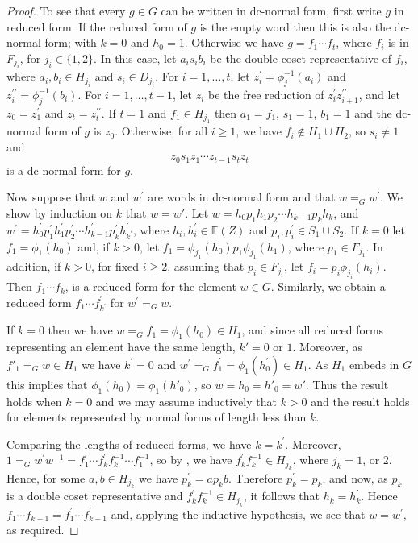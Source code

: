 \documentclass[a4paper,12pt]{article}
\numberwithin{equation}{section}
\numberwithin{figure}{section}
\newcommand{\FF}{\ensuremath{\mathbb{F}}}
\begin{document}
\begin{proof}
To see that every $g\in G$ can be written in dc-normal form, first
write $g$ in reduced form. If the reduced form of $g$ is the empty
word then this is also the dc-normal form; with $k=0$ and $h_0=1$. 
Otherwise we have $g=f_1\cdots f_t$, where $f_i$ is in $F_{j_i}$, for
$j_i\in \{1,2\}$. In this case, let $a_is_ib_i$
be the double coset representative of $f_i$, where 
$a_i,b_i\in H_{j_i}$ and $s_i\in D_{j_i}$. For $i=1,\ldots ,t$,
 let $z^{\prime}_i=\phi_j^{-1}(a_i)$ and
$z^{\prime\prime}_i=\phi_j^{-1}(b_i)$. For $i=1,\ldots ,t-1$, let 
$z_i$ be the free reduction of $z^{\prime}_iz^{\prime\prime}_{i+1}$, 
and let $z_0=z^{\prime}_1$ and $z_t=
z^{\prime\prime}_t$. 
 If $t=1$ and $f_1\in H_{j_1}$ then $a_1=f_1$, $s_1=1$, $b_1=1$ and 
the dc-normal form of $g$ is $z_0$. Otherwise, for all $i\ge 1$, we 
have $f_i\notin H_1\cup H_2$, so $s_i\neq 1$ and 
\[z_0s_1z_1\cdots z_{t-1}s_tz_t\]
is a dc-normal form for $g$.

Now suppose that $w$ and $w^\prime$ are words in dc-normal form and that
$w=_G w^\prime$. We show by induction on $k$ that $w=w'$. 
Let $w=h_{0}p_1h_{1}p_2 \cdots h_{k-1}p_kh_{{k}}$,
and $w^\prime =h_{0}^\prime p_1^\prime h_{1}^\prime  p_2^\prime
\cdots h_{k-1}^\prime p_k^\prime h_{{k^\prime}}^\prime$, where
$h_i, h_i^\prime\in \FF(Z)$ and $p_i,p_i^\prime\in S_1\cup S_2$.
If $k=0$ let $f_1=\phi_1(h_0)$ and, if $k>0$, 
let $f_1=\phi_{j_1}(h_0)p_1\phi_{j_1}(h_1)$, where $p_1\in F_{j_1}$. 
 In addition, if $k>0$,  
 for fixed $i\ge 2$, assuming that $p_i\in F_{j_i}$, 
let $f_i=p_i\phi_{j_i}(h_i)$.
 Then $f_1\cdots f_k$, is
a reduced form for the element $w\in G$. Similarly, we obtain a reduced
form $f_1^\prime \cdots f_{k^\prime}^\prime$ for $w^\prime=_G w$. 

If $k=0$ then we have $w=_G f_1=\phi_1(h_0)\in H_{1}$, and since all 
reduced forms representing an element have the same length, $k'=0$ or $1$. 
Moreover, as $f'_1=_G w\in H_1$ we have 
 $k^\prime =0$ and $w^\prime=_G f_1^\prime=\phi_1(h_0^\prime)\in H_1$.
As $H_1$ embeds in $G$ this implies that $\phi_1(h_0)=\phi_1(h'_0)$, so
$w=h_0=h'_0=w'$. Thus the result
holds when $k=0$ and we may assume inductively that $k>0$ and the result holds
for elements represented by normal forms of length less than $k$.

Comparing the lengths of reduced forms, we have $k=k^\prime$.
Moreover, $1=_G w^\prime w^{-1}= f_1^\prime \cdots f_{k}^\prime
f_k^{-1}\cdots f_1^{-1}$, so by \cite[Chapter IV, Theorem 2.6]{LS}, 
we have $ f_{k}^\prime f_k^{-1}\in H_{j_k}$, where $j_k=1$, or $2$. Hence, for
some $a, b\in H_{j_k}$ we have $p_k^\prime=a p_k b$. Therefore $p_k^\prime =p_k$,
and now, as $p_k$ is a double coset representative and  $ f_{k}^\prime f_k^{-1}\in H_{j_k}$,
it follows that $h_k=h_k^\prime$. Hence $f_1\cdots f_{k-1}=
f_1^\prime \cdots f_{k-1}^\prime$ and, applying the inductive hypothesis,
  we see that $w=w^\prime$, as required.
\end{proof}
\end{document}
